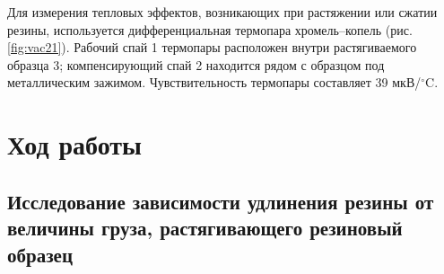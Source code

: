 \documentclass[a4paper,11.5pt]{article} %
\begin{document}
Для измерения тепловых эффектов, возникающих при растяжении или сжатии резины, используется дифференциальная термопара хромель–копель (рис. \ref{fig:vac21}). Рабочий спай 1 термопары расположен внутри растягиваемого образца 3; компенсирующий спай 2 находится рядом с образцом под металлическим зажимом. Чувствительность термопары составляет 39 мкВ/$^\circ$C.

\section{Ход работы}

\subsection{Исследование зависимости удлинения резины от величины груза, растягивающего резиновый образец}
\end{document}
